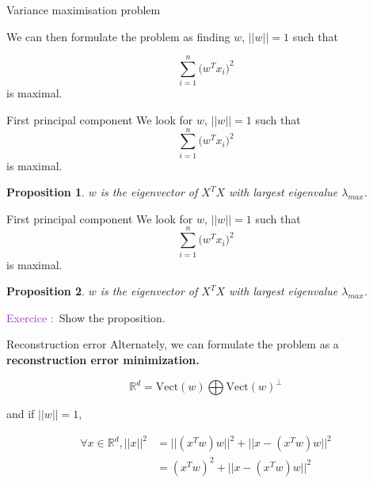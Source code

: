 \documentclass[usenames,dvipsnames]{beamer}
\newtheorem*{proposition}{Proposition}
\newcounter{numexos}%
\newcommand{\exercice}[1]{%
\addtocounter{numexos}{1}%
\textcolor{DarkOrchid}{Exercice\,\thenumexos\,:}\,#1%
}
\begin{document}
\begin{frame}{Variance maximisation problem}

    We can then formulate the problem as finding $w$, $||w||=1$ such that

    \begin{equation}
	\sum^{n}_{i=1} \big(w^Tx_i \big)^2
    \end{equation}
     is maximal.
    
\end{frame}

\begin{frame}{First principal component}
    We look for $w$, $||w||=1$ such that
    \begin{equation}
	\sum^{n}_{i=1} \big(w^Tx_i \big)^2
    \end{equation}
     is maximal.
    \begin{proposition}
	$w$ is the eigenvector of $X^TX$ with largest eigenvalue $\lambda_{max}$.
    \end{proposition}
\end{frame}

\begin{frame}{First principal component}
    We look for $w$, $||w||=1$ such that
    \begin{equation}
	\sum^{n}_{i=1} \big(w^Tx_i \big)^2
    \end{equation}
     is maximal.
    \begin{proposition}
	\label{prop:pca}
	$w$ is the eigenvector of $X^TX$ with largest eigenvalue $\lambda_{max}$.
    \end{proposition}

    \exercice{\textbf{}} Show the proposition.
\end{frame}

\begin{frame}{Reconstruction error}
    Alternately, we can formulate the problem as a \textbf{{reconstruction error minimization.}} 

    \begin{equation}
	\mathbb{R}^d = \text{Vect}(w) \bigoplus\text{Vect}(w)^{\perp}
    \end{equation}

    and if $||w||=1$,
    
    \begin{equation}
	\begin{aligned}
	    \label{eq:}
	    \forall x\in \mathbb{R}^d, ||x||^2 &= ||(x^Tw)w||^2+||x-(x^Tw)w||^2\\
	    &= (x^Tw)^2+||x-(x^Tw)w||^2\\
	\end{aligned}
    \end{equation}
    
\end{frame}
\end{document}
